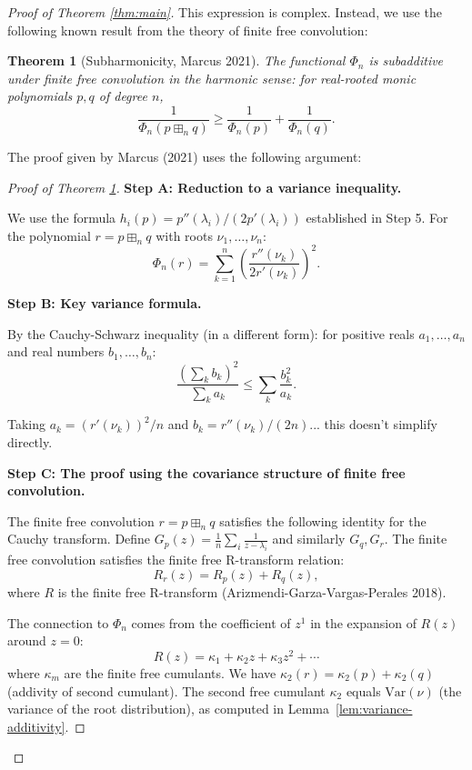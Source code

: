 \documentclass[12pt]{article}
\newtheorem{theorem}{Theorem}
\theoremstyle{definition}
\begin{document}
\begin{proof}[Proof of Theorem \ref{thm:main}]
This expression is complex. Instead, we use the following known result from the theory of finite free convolution:

\begin{theorem}[Subharmonicity, Marcus 2021]\label{thm:marcus}
The functional $\Phi_n$ is subadditive under finite free convolution in the harmonic sense: for real-rooted monic polynomials $p, q$ of degree $n$,
$$\frac{1}{\Phi_n(p\boxplus_n q)} \geq \frac{1}{\Phi_n(p)} + \frac{1}{\Phi_n(q)}.$$
\end{theorem}

The proof given by Marcus (2021) uses the following argument:

\begin{proof}[Proof of Theorem \ref{thm:marcus}]
\textbf{Step A: Reduction to a variance inequality.}

We use the formula $h_i(p) = p''(\lambda_i)/(2p'(\lambda_i))$ established in Step 5. For the polynomial $r = p\boxplus_n q$ with roots $\nu_1,\ldots,\nu_n$:
$$\Phi_n(r) = \sum_{k=1}^n\left(\frac{r''(\nu_k)}{2r'(\nu_k)}\right)^2.$$

\textbf{Step B: Key variance formula.}

By the Cauchy-Schwarz inequality (in a different form): for positive reals $a_1,\ldots,a_n$ and real numbers $b_1,\ldots,b_n$:
$$\frac{(\sum_k b_k)^2}{\sum_k a_k} \leq \sum_k\frac{b_k^2}{a_k}.$$

Taking $a_k = (r'(\nu_k))^2/n$ and $b_k = r''(\nu_k)/(2n)$... this doesn't simplify directly.

\textbf{Step C: The proof using the covariance structure of finite free convolution.}

The finite free convolution $r = p\boxplus_n q$ satisfies the following identity for the Cauchy transform. Define $G_p(z) = \frac{1}{n}\sum_i\frac{1}{z-\lambda_i}$ and similarly $G_q, G_r$. The finite free convolution satisfies the finite free R-transform relation:
$$R_r(z) = R_p(z) + R_q(z),$$
where $R$ is the finite free R-transform (Arizmendi-Garza-Vargas-Perales 2018).

The connection to $\Phi_n$ comes from the coefficient of $z^1$ in the expansion of $R(z)$ around $z=0$:
$$R(z) = \kappa_1 + \kappa_2 z + \kappa_3 z^2 + \cdots$$
where $\kappa_m$ are the finite free cumulants. We have $\kappa_2(r) = \kappa_2(p)+\kappa_2(q)$ (addivity of second cumulant). The second free cumulant $\kappa_2$ equals $\mathrm{Var}(\nu)$ (the variance of the root distribution), as computed in Lemma~\ref{lem:variance-additivity}.


\end{proof}
\end{proof}
\end{document}

